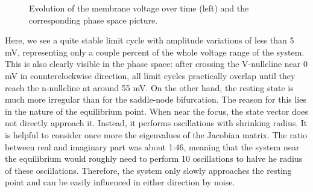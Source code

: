 \documentclass[12pt,a4paper]{article}
\begin{document}
\begin{figure}[H]
	\hspace*{-0.5cm}
	
	\caption{Evolution of the membrane voltage over time (left) and the corresponding phase space picture.}
	\label{ppcompanhopf}
\end{figure}
Here, we see a quite stable limit cycle with amplitude variations of less than 5 mV, representing only a couple percent of the whole voltage range of the system. This is also clearly visible in the phase space: after crossing the V-nullcline near 0 mV in counterclockwise direction, all limit cycles practically overlap until they reach the n-nullcline at around 55 mV. On the other hand, the resting state is much more irregular than for the saddle-node bifurcation. The reason for this lies in the nature of the equilibrium point. When near the focus, the state vector does not directly approach it. Instead, it performs oscillations with shrinking radius. It is helpful to consider once more the eigenvalues of the Jacobian matrix. The ratio between real and imaginary part was about 1:46, meaning that the system near the equilibrium would roughly need to perform 10 oscillations to halve he radius of these oscillations. Therefore, the system only slowly approaches the resting point and can be easily influenced in either direction by noise.
\end{document}
